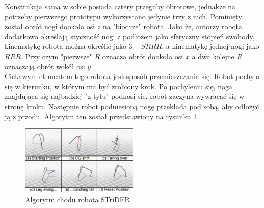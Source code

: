 Konstrukcja sama w sobie posiada cztery przeguby obrotowe, jednakże na potrzeby pierwszego prototypu wykorzystano jedynie trzy z nich. Pominięty został obrót nogi dookoła osi $z$ na "biodrze" robota. Jako że, autorzy robota dodatkowo określają styczność nogi z podłożem jako sferyczny stopień swobody, kinematykę robota można określić jako $3-SRRR$, a kinematykę jednej nogi jako $RRR$. Przy czym "pierwsze" $R$ oznacza obrót dookoła osi $x$ a dwa kolejne $R$ oznaczają obrót wokół osi $y$. \cite{strider}\\



Ciekawym elementem tego robota jest sposób przemieszczania się. Robot pochyla się w kierunku, w którym ma być zrobiony krok. Po pochyleniu się, noga znajdująca się najbadziej "z tyłu" podnosi się, robot zaczyna wywracać się w stronę kroku. Następnie robot podniesioną nogę przekłada pod sobą, aby odłożyć ją z przodu. Algorytm ten został przedstawiony na rysunku \ref{img:strider_walk}.  \cite{strider}\\


\begin{figure}[h!]
\centering
\includegraphics[width=0.5\textwidth]{img/strider_walking_algorithm.png}
\caption{Algorytm chodu robota STriDER \cite{strider}}
\label{img:strider_walk}
\end{figure}

